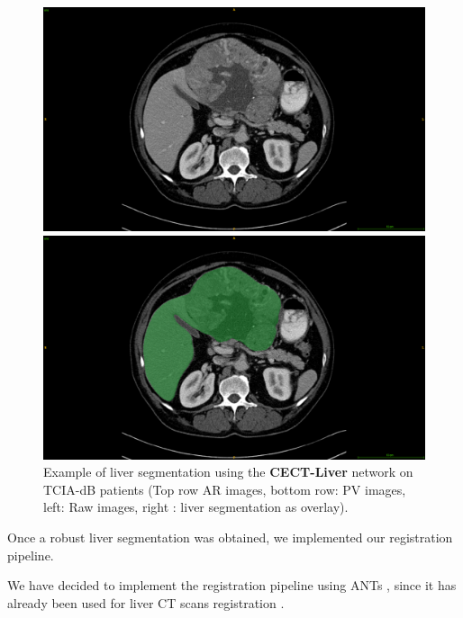 \documentclass[]{article}
\newcommand{\pplfont}[1]{{\textbf{\fontfamily{ppl}\selectfont #1}}}
\newcommand{\lmttfont}[1]{{\fontfamily{lmtt}\selectfont #1}}
\begin{document}
\begin{figure}[ht!]
\vspace{0.8cm}
\begin{minipage}{0.45\linewidth}
\includegraphics[width=0.9\linewidth]{./images/TCIA_CECTLiver_prediction_TCGA-DD-A11A_slice42_raw}
\end{minipage}
\hspace{0.3cm}
\begin{minipage}{0.45\linewidth}
\includegraphics[width=0.9\linewidth]{./images/TCIA_CECTLiver_prediction_TCGA-DD-A11A_slice42_greenLiver}
\end{minipage}
\caption{Example of liver segmentation using the \pplfont{CECT-Liver} network on \lmttfont{TCIA-dB}
patients (Top row AR images, bottom row: PV images, left:
Raw images, right : liver segmentation as overlay).}
\label{fig:LiverPredTciaDb}
\end{figure}



Once a robust liver segmentation was obtained, we implemented our
registration pipeline.

We have decided to implement the registration pipeline using ANTs \cite{avants2009advanced}, since it has already been used for liver
CT scans registration \cite{Zhao2019,Zhao2020}.
\end{document}
